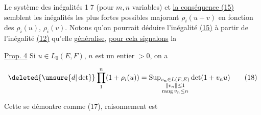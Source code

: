 Le système des inégalités \textcircled{17} (pour $m,n$ variables) et \uline{la conséquence (15)} semblent les inégalités les plus fortes possibles majorant   $\rho_i(u+v)$ en fonction des $\rho_i(u)$, $\rho_i(v)$. Notons qu'on pourrait déduire   l'inégalité \uline{(15)} à partir de l'inégalité \uline{(12)} qu'elle \uline{généralise}, \uline{pour cela signalons} la 

\uline{Prop. 4} Si $u\in L_0(E,F)$,  $n$ est un entier $>0$, on a

\[
\deleted{\unsure{d|\det}}\prod_1^n(1+\rho_i(u))=\operatorname{Sup}_{\substack{v_n\in L(F,E)\\\lVert v_n\rVert\leq1\\\operatorname{rang}v_n\leq n}}\det(1+v_nu)\tag*{(18)}
\]

Cette   se démontre comme (17),   raisonnement est  

